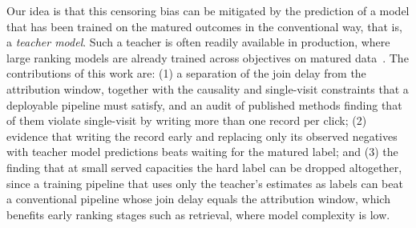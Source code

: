 Our idea is that this censoring bias can be mitigated by the prediction of a model that has been
trained on the matured outcomes in the conventional way, that is, a \emph{teacher model}. Such a
teacher is often readily available in production, where large ranking models are already trained
across objectives on matured data~\cite{meta2025gem}. The contributions of this work are: (1) a
separation of the join delay from the attribution window, together with the causality and
single-visit constraints that a deployable pipeline must satisfy, and an audit of \nScreened{}
published methods finding that \nFail{} of them violate single-visit by writing more than one
record per click; (2) evidence that writing the record early and replacing only its observed
negatives with teacher model predictions beats waiting for the matured label; and (3) the
finding that at small served capacities the hard label can be dropped altogether, since a
training pipeline that uses only the teacher's estimates as labels can beat a conventional
pipeline whose join delay equals the attribution window, which benefits early ranking stages
such as retrieval, where model complexity is low.
